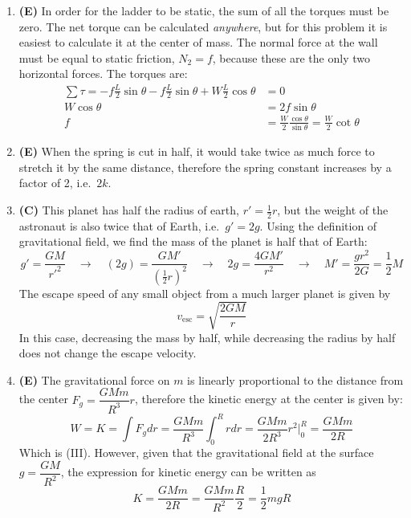 \documentclass{../../oss-handout}
\begin{document}
\begin{enumerate}[leftmargin=17pt]
\item\textbf{(E)} In order for the ladder to be static, the sum of all the
  torques must be zero. The net torque can be calculated \emph{anywhere}, but
  for this problem it is easiest to calculate it at the center of mass. The
  normal force at the wall must be equal to static friction, $N_2=f$, because
  these are the only two horizontal forces. The torques are:
  \begin{align*}
    \sum\tau=-f\frac L2\sin\theta-f\frac L2\sin\theta+W\frac L2\cos\theta&=0\\
    W\cos\theta&=2f\sin\theta\\
    f&=\frac W2\frac{\cos\theta}{\sin\theta}=\boxed{\frac W2\cot\theta}
  \end{align*}

\item\textbf{(E)} When the spring is cut in half, it would take twice as much
  force to stretch it by the same distance, therefore the spring constant
  increases by a factor of 2, i.e.\ $\boxed{2k}$.

\item\textbf{(C)} This planet has half the radius of earth, $r'=\frac12 r$, but
  the weight of the astronaut is also twice that of Earth, i.e.\ $g'=2g$. Using
  the definition of gravitational field, we find the mass of the planet is half
  that of Earth:
  \begin{equation*}
    g'=\frac{GM}{r'^2}\quad\longrightarrow\quad
    (2g)=\frac{GM'}{(\frac12r)^2}\quad\longrightarrow\quad
    2g=\frac{4GM'}{r^2}\quad\longrightarrow\quad
    M'=\frac{gr^2}{2G}=\frac12M
  \end{equation*}
  The escape speed of any small object from a much larger planet is given by
  \begin{equation*}
    v_\text{esc}=\sqrt{\frac{2GM}{r}}
  \end{equation*}
  In this case, decreasing the mass by half, while decreasing the radius by half
  does not change the escape velocity.
\item\textbf{(E)} The gravitational force on $m$ is linearly proportional
  to the distance from the center $F_g=\dfrac{GMm}{R^3}r$, therefore the kinetic
  energy at the center is given by:
  \begin{equation*}
    W=K=\int F_gdr=\frac{GMm}{R^3}\int_0^R rdr=
    \frac{GMm}{2R^3}r^2\Biggr|^R_0=\boxed{\frac{GMm}{2R}}
  \end{equation*}
  Which is (III). However, given that the gravitational field at the surface
  $g=\dfrac{GM}{R^2}$, the expression for kinetic energy can be written as
  \begin{equation*}
    K=\frac{GMm}{2R}=\frac{GMm}{R^2}\frac R2=\boxed{\frac12mgR}
  \end{equation*}
\end{enumerate}
\end{document}

